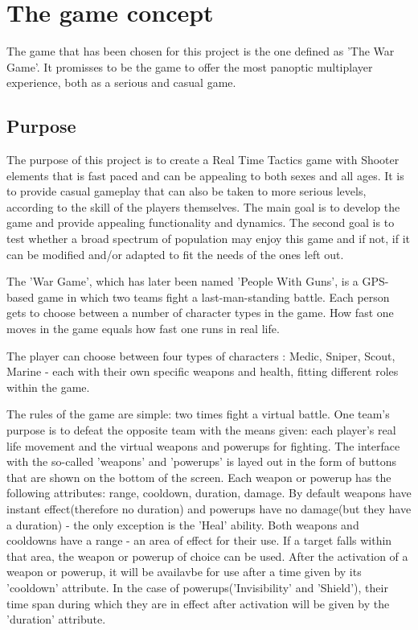 \section{The game concept}

The game that has been chosen for this project is the one defined as 'The War
Game'. It promisses to be the game to offer the most panoptic multiplayer
experience, both as a serious and casual game.\newline

\subsection{Purpose}

The purpose of this project is to create a Real Time Tactics game with Shooter
elements that is fast paced and can be appealing to both sexes and all ages. It
is to provide casual gameplay that can also be taken to more serious levels,
according to the skill of the players themselves. The main goal is to develop
the game and provide appealing functionality and dynamics. The second goal is to
test whether a broad spectrum of population may enjoy this game and if not, if
it can be modified and/or adapted to fit the needs of the ones left out.\newline

The 'War Game', which has later been named 'People With Guns', is a GPS-based
game in which two teams fight a last-man-standing battle. Each person gets to
choose between a number of character types in the game. How fast one moves in
the game equals how fast one runs in real life.\newline

The player can choose between four types of characters : Medic, Sniper, Scout,
Marine - each with their own specific weapons and health, fitting different
roles within the game.\newline

The rules of the game are simple: two times fight a virtual battle. One team's
purpose is to defeat the opposite team with the means given: each player's real
life movement and the virtual weapons and powerups for fighting. The interface
with the so-called 'weapons' and 'powerups' is layed out in the form of buttons
that are shown on the bottom of the screen. Each weapon or powerup has the
following attributes: range, cooldown, duration, damage. By default weapons have
instant effect(therefore no duration) and powerups have no damage(but they have
a duration) - the only exception is the 'Heal' ability. Both weapons and
cooldowns have a range - an area of effect for their use. If a target falls
within that area, the weapon or powerup of choice can be used. After the
activation of a weapon or powerup, it will be availavbe for use after a time
given by its 'cooldown' attribute. In the case of powerups('Invisibility' and
'Shield'), their time span during which they are in effect after activation will
be given by the 'duration' attribute. \newline

